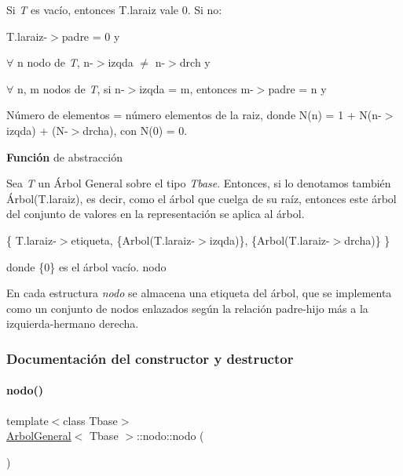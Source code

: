 Si {\itshape T} es vacío, entonces T.\+laraiz vale 0. Si no\+:
\begin{DoxyItemize}
\item T.\+laraiz-\/$>$padre = 0 y
\item $ \forall $ n nodo de {\itshape T}, n-\/$>$izqda $ \neq $ n-\/$>$drch y
\item $ \forall $ n, m nodos de {\itshape T}, si n-\/$>$izqda = m, entonces m-\/$>$padre = n y
\item Número de elementos = número elementos de la raiz, donde N(n) = 1 + N(n-\/$>$izqda) + (N-\/$>$drcha), con N(0) = 0.
\end{DoxyItemize}

{\bfseries Función} de abstracción

Sea {\itshape T} un Árbol General sobre el tipo {\itshape Tbase}. Entonces, si lo denotamos también Árbol(T.\+laraiz), es decir, como el árbol que cuelga de su raíz, entonces este árbol del conjunto de valores en la representación se aplica al árbol.

\{ T.\+laraiz-\/$>$etiqueta, \{Arbol(T.\+laraiz-\/$>$izqda)\}, \{Arbol(T.\+laraiz-\/$>$drcha)\} \}

donde \{0\} es el árbol vacío. nodo

En cada estructura {\itshape nodo} se almacena una etiqueta del árbol, que se implementa como un conjunto de nodos enlazados según la relación padre-\/hijo más a la izquierda-\/hermano derecha. 

\subsubsection{Documentación del constructor y destructor}
\hypertarget{structArbolGeneral_1_1nodo_aa217b530d586a4f7908df98083c697ff}{}\label{structArbolGeneral_1_1nodo_aa217b530d586a4f7908df98083c697ff} 
\paragraph{\texorpdfstring{nodo()}{nodo()}\hspace{0.1cm}{\footnotesize\ttfamily [1/2]}}
{\footnotesize\ttfamily template$<$class Tbase$>$ \\
\hyperlink{classArbolGeneral}{Arbol\+General}$<$ Tbase $>$\+::nodo\+::nodo (\begin{DoxyParamCaption}{ }\end{DoxyParamCaption})\hspace{0.3cm}{\ttfamily [inline]}}



